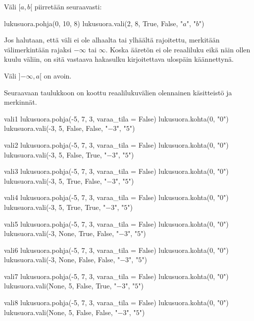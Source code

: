 \begin{esimerkki}
Väli $[a, b[$ piirretään seuraavasti:

\begin{kuva}
lukusuora.pohja(0, 10, 8)
lukusuora.vali(2, 8, True, False, "$a$", "$b$")
\end{kuva}
\end{esimerkki}

Jos halutaan, että väli ei ole alhaalta tai ylhäältä rajoitettu, merkitään välimerkintään rajaksi $-\infty$ tai $\infty$. Koska ääretön ei ole reaaliluku eikä näin ollen kuulu väliin, on sitä vastaava hakasulku kirjoitettava ulospäin käännettynä.

\begin{esimerkki}
Väli $]{-\infty}, a[$ on avoin. 
\end{esimerkki}

Seuraavaan taulukkoon on koottu reaalilukuvälien olennainen käsitteistö ja merkinnät.

\begin{luoKuva}{vali1}
lukusuora.pohja(-5, 7, 3, varaa_tila = False)
lukusuora.kohta(0, "$0$")
lukusuora.vali(-3, 5, False, False, "$-3$", "$5$")
\end{luoKuva}
\begin{luoKuva}{vali2}
lukusuora.pohja(-5, 7, 3, varaa_tila = False)
lukusuora.kohta(0, "$0$")
lukusuora.vali(-3, 5, False, True, "$-3$", "$5$")
\end{luoKuva}
\begin{luoKuva}{vali3}
lukusuora.pohja(-5, 7, 3, varaa_tila = False)
lukusuora.kohta(0, "$0$")
lukusuora.vali(-3, 5, True, False, "$-3$", "$5$")
\end{luoKuva}
\begin{luoKuva}{vali4}
lukusuora.pohja(-5, 7, 3, varaa_tila = False)
lukusuora.kohta(0, "$0$")
lukusuora.vali(-3, 5, True, True, "$-3$", "$5$")
\end{luoKuva}
\begin{luoKuva}{vali5}
lukusuora.pohja(-5, 7, 3, varaa_tila = False)
lukusuora.kohta(0, "$0$")
lukusuora.vali(-3, None, True, False, "$-3$", "$5$")
\end{luoKuva}
\begin{luoKuva}{vali6}
lukusuora.pohja(-5, 7, 3, varaa_tila = False)
lukusuora.kohta(0, "$0$")
lukusuora.vali(-3, None, False, False, "$-3$", "$5$")
\end{luoKuva}
\begin{luoKuva}{vali7}
lukusuora.pohja(-5, 7, 3, varaa_tila = False)
lukusuora.kohta(0, "$0$")
lukusuora.vali(None, 5, False, True, "$-3$", "$5$")
\end{luoKuva}
\begin{luoKuva}{vali8}
lukusuora.pohja(-5, 7, 3, varaa_tila = False)
lukusuora.kohta(0, "$0$")
lukusuora.vali(None, 5, False, False, "$-3$", "$5$")
\end{luoKuva}

